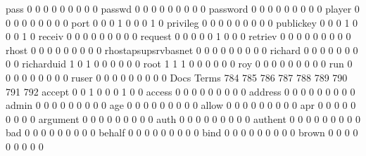 \documentclass[compress,8pt]{beamer}
\begin{document}
\begin{frame}
\begin{Schunk}
  pass                                       0   0   0   0   0   0   0   0   0
  passwd                                     0   0   0   0   0   0   0   0   0
  password                                   0   0   0   0   0   0   0   0   0
  player                                     0   0   0   0   0   0   0   0   0
  port                                       0   0   0   1   0   0   0   1   0
  privileg                                   0   0   0   0   0   0   0   0   0
  publickey                                  0   0   0   1   0   0   0   1   0
  receiv                                     0   0   0   0   0   0   0   0   0
  request                                    0   0   0   0   0   1   0   0   0
  retriev                                    0   0   0   0   0   0   0   0   0
  rhost                                      0   0   0   0   0   0   0   0   0
  rhostapsupsrvbasnet                        0   0   0   0   0   0   0   0   0
  richard                                    0   0   0   0   0   0   0   0   0
  richarduid                                 1   0   1   0   0   0   0   0   0
  root                                       1   1   1   0   0   0   0   0   0
  roy                                        0   0   0   0   0   0   0   0   0
  run                                        0   0   0   0   0   0   0   0   0
  ruser                                      0   0   0   0   0   0   0   0   0
                                          Docs
Terms                                      784 785 786 787 788 789 790 791 792
  accept                                     0   0   1   0   0   0   1   0   0
  access                                     0   0   0   0   0   0   0   0   0
  address                                    0   0   0   0   0   0   0   0   0
  admin                                      0   0   0   0   0   0   0   0   0
  age                                        0   0   0   0   0   0   0   0   0
  allow                                      0   0   0   0   0   0   0   0   0
  apr                                        0   0   0   0   0   0   0   0   0
  argument                                   0   0   0   0   0   0   0   0   0
  auth                                       0   0   0   0   0   0   0   0   0
  authent                                    0   0   0   0   0   0   0   0   0
  bad                                        0   0   0   0   0   0   0   0   0
  behalf                                     0   0   0   0   0   0   0   0   0
  bind                                       0   0   0   0   0   0   0   0   0
  brown                                      0   0   0   0   0   0   0   0   0

\end{Schunk}
\end{frame}
\end{document}
